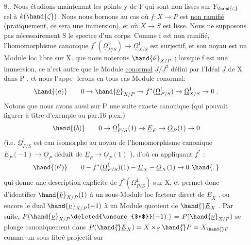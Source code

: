 
8.. Nous étudions maintenant les points  y de $\underline{Y}$ qui sont non lisses
sur $Y_{\hand{\zeta}}$ rel à $k(\hand{\zeta})$. Nous nous  bornons au cas où  $f:X\to P$  est \uline{non ramifié}
(pratiquement, ce sera une immersion), et où $X\to S$ est lisse.  Nous ne
supposons pas nécessairement S le spectre d'un corps.  
 Comme
f  est non ramifié, l'homomorphisme canonique   $f^*(\underline{\Omega}^1_{P/S})\to\underline{\Omega}^1_{X/S}$
est surjectif, et son noyau est un Module loc libre sur X, que nous
noterons  $\hand{\check{\nu}}_{X/P}$ ; lorsque f est une immersion, ce n'est autre que le
Module \uline{conormal}  $\underline{J}/\underline{J}^2$  défini par l'Idéal $\underline{J}$ de X dans P , et nous l'appe-%
lerons en tous cas Module conormal:
\[ \hand{(a)} \qquad 0\to\hand{\check{\underline{\nu}}}_{X/P}\to f^*(\underline{\Omega}^1_{P/S})\to\underline{\Omega}^1_{X/S}\to 0 \ . \]
 Notons que nous avons aussi sur  P  une suite exacte canonique
(qui pouvait figurer à titre d'exemple au par.16 p.ex.)
\[ \hand{(b)} \qquad 0\to\underline{\Omega}^1_{P/S}(1)\to\underline{E}_P\to\underline{O}_P(1)\to 0 \]
(i.e. $\underline{\Omega}^1_{P/S}$ est can isomorphe au noyau de l'homomorphisme canonique
$\underline{E}_P(-1)\to\underline{O}_P$  déduit de $\underline{E}_P\to\underline{O}_P(1)$ ), d'où en appliquant $f^*$ :
\[ \hand{(b')} \qquad 0 - f^*(\underline{\Omega}^1_{P/S})(1) - \underline{E}_X - \underline{O}_X(1)\to 0 \ \hand{,} \]
qui donne une description explicite de  $f^*(\underline{\Omega}^1_{P/S})$   sur X, et
permet  donc d'identifier $\hand{\check{\underline{\nu}}}_{X/P}(1)$  à un sous-Module loc facteur direct
de $\underline{E}_X$ , ou encore le  dual  $\hand{\underline{\nu}}_{X/P}(-1)$  à un Module
quotient de $\hand{\check{}}\underline{E}_X$ .  Par suite,   $P(\hand{\underline{\nu}}_{X/P}\deleted{\unsure{$*$}}(-1)\ )$  =  $P(\hand{\underline{\nu}}_{X/P})$  se plonge
canoniquement dans  $P(\hand{\check{}}\underline{E}_X) = X\times_S\hand{\check{}}P = X_{\hand{\check{}}P}$ comme un sous-fibré projectif sur

